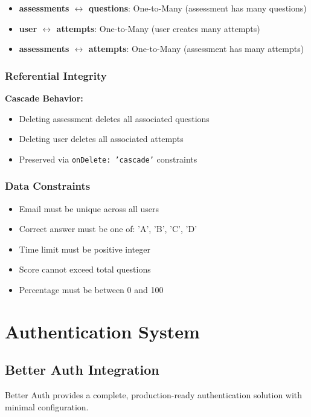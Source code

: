 \documentclass[12pt,a4paper]{report}
\begin{document}
\begin{itemize}
    \item \textbf{assessments $\leftrightarrow$ questions}: One-to-Many (assessment has many questions)
    \item \textbf{user $\leftrightarrow$ attempts}: One-to-Many (user creates many attempts)
    \item \textbf{assessments $\leftrightarrow$ attempts}: One-to-Many (assessment has many attempts)
\end{itemize}

\subsection{Referential Integrity}

\textbf{Cascade Behavior:}
\begin{itemize}
    \item Deleting assessment deletes all associated questions
    \item Deleting user deletes all associated attempts
    \item Preserved via \texttt{onDelete: 'cascade'} constraints
\end{itemize}

\subsection{Data Constraints}

\begin{itemize}
    \item Email must be unique across all users
    \item Correct answer must be one of: 'A', 'B', 'C', 'D'
    \item Time limit must be positive integer
    \item Score cannot exceed total questions
    \item Percentage must be between 0 and 100
\end{itemize}

\chapter{Authentication System}

\section{Better Auth Integration}

Better Auth provides a complete, production-ready authentication solution with minimal configuration.
\end{document}
